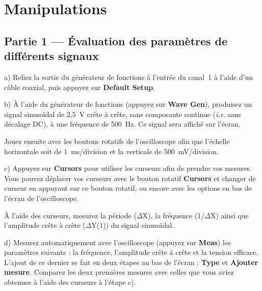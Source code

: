 \documentclass[canadien,12pt,oneside,letterpaper]{article}
\begin{document}
\section{Manipulations}

\setlength{\parskip}{1ex plus 0.5ex minus 0.2ex}


\subsection{Partie 1 --- Évaluation des paramètres de différents signaux}

a) Reliez la sortie du générateur de fonctions à l'entrée du canal~1 à l'aide d'un câble coaxial, puis appuyez sur \textbf{Default Setup}.

b) À l'aide du générateur de fonctions (appuyez sur \textbf{Wave Gen}), produisez un signal sinusoïdal de 2,5~V crête à crête, sans composante continue (\textit{i.e.} sans décalage DC), à une fréquence de 500~Hz. Ce signal sera affiché sur l'écran.

Jouez ensuite avec les boutons rotatifs de l'oscilloscope afin que l'échelle horizontale soit de 1~ms/division et la verticale de 500~mV/division.

c) Appuyez sur \textbf{Cursors} pour utiliser les curseurs afin de prendre vos mesures. Vous pouvez déplacer vos curseurs avec le bouton rotatif \textbf{Cursors} et changer de curseur en appuyant sur ce bouton rotatif, ou encore avec les options en bas de l'écran de l'oscilloscope.

À l'aide des curseurs, mesurez la période ($\Delta$X), la fréquence (1/$\Delta$X) ainsi que l'amplitude crête à crête ($\Delta$Y(1)) du signal sinusoïdal.

\vspace{1ex}
\noindent{}

d) Mesurez automatiquement avec l'oscilloscope (appuyez sur \textbf{Meas}) les paramètres suivants : la fréquence, l'amplitude crête à crête et la tension efficace. L'ajout de ce dernier se fait en deux étapes au bas de l'écran : \textbf{Type} et \textbf{Ajouter mesure}. Comparez les deux premières mesures avec celles que vous aviez obtenues à l'aide des curseurs à l'étape c).
\end{document}

